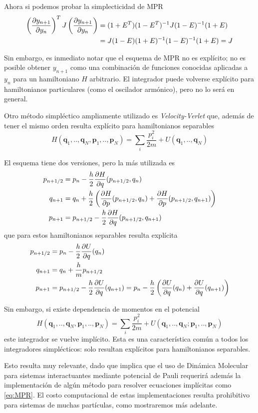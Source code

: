 Ahora si podemos probar la simplecticidad de MPR
\begin{align*}
\left(\frac{\partial y_{n+1}}{\partial y_n}\right)^TJ\left(\frac{\partial y_{n+1}}{\partial y_n}\right) &= (1+E^T)(1-E^T)^{-1}J(1-E)^{-1}(1+E) \\
&= J(1-E)(1+E)^{-1}(1-E)^{-1}(1+E) = J
\end{align*}


Sin embargo, es inmediato notar que el esquema de MPR no es explícito; no es posible obtener $y_{n+1}$ como una combinación de funciones conocidas aplicadas a $y_n$ para un hamiltoniano $H$ arbitrario.
El integrador puede volverse explícito para hamiltonianos particulares (como el oscilador armónico), pero no lo será en general.

Otro método simpléctico ampliamente utilizado es \textit{Velocity-Verlet} que, además de tener el mismo orden resulta explícito para hamiltonianos separables
\[ H(\mathbf{q}_1,..,\mathbf{q}_N,\mathbf{p}_1,..,\mathbf{p}_N) = \sum_i \frac{p_i^2}{2m} + U(\mathbf{q}_1,..,\mathbf{q}_N)\]

El esquema tiene dos versiones, pero la más utilizada es
\begin{align*}
 p_{n+1/2} &= p_n - \frac{h}{2}\frac{\partial H}{\partial q}(p_{n+1/2}, q_n) \\
 q_{n+1} &= q_n + \frac{h}{2}\left( \frac{\partial H}{\partial p}(p_{n+1/2}, q_n) + \frac{\partial H}{\partial p}(p_{n+1/2}, q_{n+1}) \right) \\
 p_{n+1} &= p_{n+1/2} - \frac{h}{2}\frac{\partial H}{\partial q}(p_{n+1/2}, q_{n+1})
\end{align*}
que para estos hamiltonianos separables resulta explícita
\begin{align*}
 p_{n+1/2} &= p_n - \frac{h}{2}\frac{\partial U}{\partial q}(q_n) \\
 q_{n+1} &= q_n + \frac{h}{m}p_{n+1/2} \\
 p_{n+1} &= p_{n+1/2} - \frac{h}{2}\frac{\partial U}{\partial q}(q_{n+1}) = p_n - \frac{h}{2} \left( \frac{\partial U}{\partial q}(q_n) + \frac{\partial U}{\partial q}(q_{n+1}) \right)
\end{align*}

Sin embargo, si existe dependencia de momentos en el potencial
\[ H(\mathbf{q}_1,..,\mathbf{q}_N,\mathbf{p}_1,..,\mathbf{p}_N) = \sum_i \frac{p_i^2}{2m} + U(\mathbf{q}_1,..,\mathbf{q}_N;\mathbf{p}_1,..,\mathbf{p}_N)\]
este integrador se vuelve implícito.
Esta es una característica común a todos los integradores simplécticos: solo resultan explícitos para hamiltonianos separables.

Esto resulta muy relevante, dado que implica que el uso de Dinámica Molecular para sistemas interactuantes mediante potencial de Pauli requerirá además la implementación
de algún método para resolver ecuaciones implícitas como \eqref{eq:MPR}.
El costo computacional de estas implementaciones resulta prohibitivo para sistemas de muchas partículas, como mostraremos más adelante.

